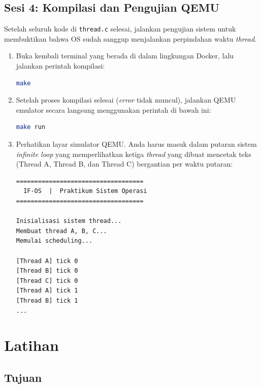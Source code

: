 \subsection{Sesi 4: Kompilasi dan Pengujian QEMU}
\label{sec:m08-sesi-4}
Setelah seluruh kode di \texttt{thread.c} selesai, jalankan pengujian sistem untuk membuktikan bahwa OS sudah sanggup menjalankan perpindahan waktu \textit{thread}.

\begin{enumerate}
	\item Buka kembali terminal yang berada di dalam lingkungan Docker, lalu jalankan perintah kompilasi:
	      \begin{lstlisting}[language=bash, caption={Perintah build pada terminal Docker}]
make
    \end{lstlisting}
	\item Setelah proses kompilasi selesai (\textit{error} tidak muncul), jalankan QEMU emulator secara langsung menggunakan perintah di bawah ini:
	      \begin{lstlisting}[language=bash, caption={Menjalankan OS pada terminal Docker}]
make run
    \end{lstlisting}
	\item Perhatikan layar simulator QEMU. Anda harus masuk dalam putaran sistem \textit{infinite loop} yang memperlihatkan ketiga \textit{thread} yang dibuat mencetak teks (Thread A, Thread B, dan Thread C) bergantian per waktu putaran:
	      \begin{lstlisting}[caption={Ekspektasi output sistem penjadwalan Thread di latar QEMU}]
===================================
  IF-OS  |  Praktikum Sistem Operasi
===================================

Inisialisasi sistem thread...
Membuat thread A, B, C...
Memulai scheduling...

[Thread A] tick 0
[Thread B] tick 0
[Thread C] tick 0
[Thread A] tick 1
[Thread B] tick 1
...
    \end{lstlisting}
\end{enumerate}

\section{Latihan}

\subsection{Tujuan}

